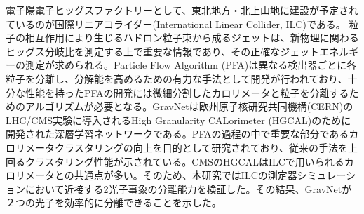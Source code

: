 電子陽電子ヒッグスファクトリーとして、東北地方・北上山地に建設が予定されているのが国際リニアコライダー(International Linear Collider, ILC)である。%
   粒子の相互作用により生じるハドロン粒子束から成るジェットは、新物理に関わるヒッグス分岐比を測定する上で重要な情報であり、その正確なジェットエネルギーの測定が求められる。Particle Flow Algorithm (PFA)は異なる検出器ごとに各粒子を分離し、分解能を高めるための有力な手法として開発が行われており、十分な性能を持ったPFAの開発には微細分割したカロリメータと粒子を分離するためのアルゴリズムが必要となる。GravNetは欧州原子核研究共同機構(CERN)のLHC/CMS実験に導入されるHigh Granularity CALorimeter (HGCAL)のために開発された深層学習ネットワークである。PFAの過程の中で重要な部分であるカロリメータクラスタリングの向上を目的として研究されており、従来の手法を上回るクラスタリング性能が示されている。CMSのHGCALはILCで用いられるカロリメータとの共通点が多い。そのため、本研究ではILCの測定器シミュレーションにおいて近接する2光子事象の分離能力を検証した。その結果、GravNetが２つの光子を効率的に分離できることを示した。
  
